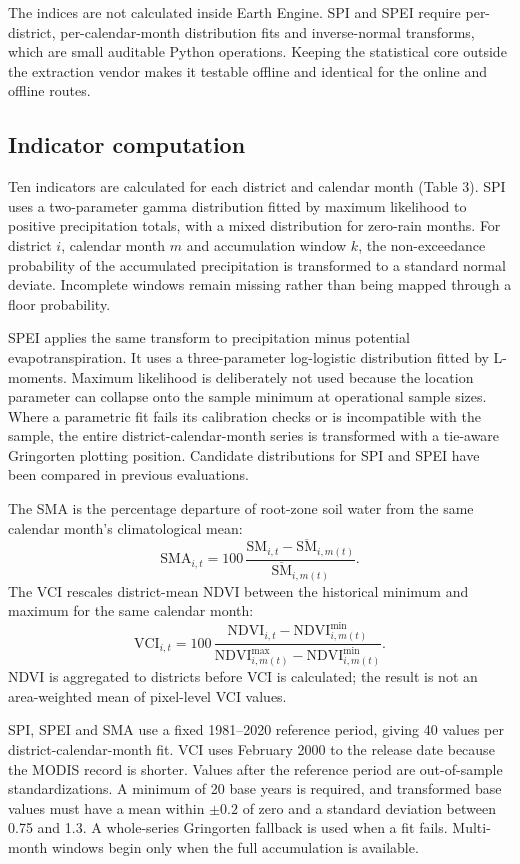 \documentclass[11pt,a4paper]{article}
\begin{document}
The indices are not calculated inside Earth Engine. SPI and SPEI require per-district, per-calendar-month distribution fits and inverse-normal transforms, which are small auditable Python operations. Keeping the statistical core outside the extraction vendor makes it testable offline and identical for the online and offline routes.

\subsection*{Indicator computation}
Ten indicators are calculated for each district and calendar month (Table 3). SPI uses a two-parameter gamma distribution fitted by maximum likelihood to positive precipitation totals, with a mixed distribution for zero-rain months\citep{McKee1993}. For district $i$, calendar month $m$ and accumulation window $k$, the non-exceedance probability of the accumulated precipitation is transformed to a standard normal deviate. Incomplete windows remain missing rather than being mapped through a floor probability.

SPEI applies the same transform to precipitation minus potential evapotranspiration. It uses a three-parameter log-logistic distribution fitted by L-moments\citep{VicenteSerrano2010,Begueria2014,Hosking1990}. Maximum likelihood is deliberately not used because the location parameter can collapse onto the sample minimum at operational sample sizes. Where a parametric fit fails its calibration checks or is incompatible with the sample, the entire district-calendar-month series is transformed with a tie-aware Gringorten plotting position\citep{Gringorten1963}. Candidate distributions for SPI and SPEI have been compared in previous evaluations\citep{Stagge2015}.

The SMA is the percentage departure of root-zone soil water from the same calendar month's climatological mean:
\[
\mathrm{SMA}_{i,t}=100\,\frac{\mathrm{SM}_{i,t}-\overline{\mathrm{SM}}_{i,m(t)}}{\overline{\mathrm{SM}}_{i,m(t)}}.
\]
The VCI rescales district-mean NDVI between the historical minimum and maximum for the same calendar month\citep{Kogan1995}:
\[
\mathrm{VCI}_{i,t}=100\,\frac{\mathrm{NDVI}_{i,t}-\mathrm{NDVI}^{\min}_{i,m(t)}}{\mathrm{NDVI}^{\max}_{i,m(t)}-\mathrm{NDVI}^{\min}_{i,m(t)}}.
\]
NDVI is aggregated to districts before VCI is calculated; the result is not an area-weighted mean of pixel-level VCI values.

SPI, SPEI and SMA use a fixed 1981--2020 reference period, giving 40 values per district-calendar-month fit. VCI uses February 2000 to the release date because the MODIS record is shorter. Values after the reference period are out-of-sample standardizations. A minimum of 20 base years is required, and transformed base values must have a mean within $\pm0.2$ of zero and a standard deviation between 0.75 and 1.3. A whole-series Gringorten fallback is used when a fit fails. Multi-month windows begin only when the full accumulation is available.
\end{document}
